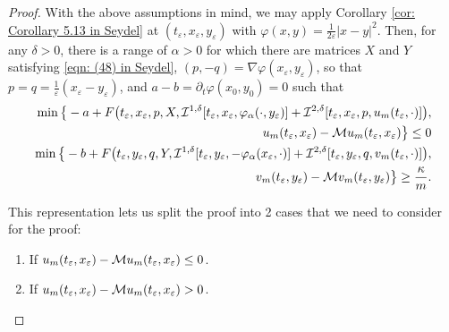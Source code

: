 \begin{proof}
    With the above assumptions in mind, we may apply Corollary \ref{cor: Corollary 5.13 in Seydel} at $(t_\varepsilon,x_\varepsilon,y_\varepsilon)$ with $\varphi(x,y) = \frac{1}{2\varepsilon} |x-y|^2$. Then, for any $\delta > 0$, there is a range of $\alpha>0$ for which there are matrices $X$ and $Y$ satisfying \eqref{eqn: (48) in Seydel}, $(p,-q) = \nabla \varphi(x_\varepsilon,y_\varepsilon)$, so that $p=q=\frac{1}{\varepsilon}(x_\varepsilon - y_\varepsilon)$, and $a-b= \partial_t \varphi(x_0,y_0) = 0$ such that
    \begin{equation*}
        \begin{aligned}
            \min \big\{-a + F\big(t_\varepsilon, x_\varepsilon, p, X, \mathcal{I}^{1,\delta}[t_\varepsilon,x_\varepsilon,\varphi_\alpha(\cdot,y_\varepsilon)] + \mathcal{I}^{2,\delta}[t_\varepsilon,x_\varepsilon,p,u_m(t_\varepsilon,\cdot)]\big), \\
            u_m(t_\varepsilon, x_\varepsilon) - \mathcal{M} u_m(t_\varepsilon,x_\varepsilon) \big\} \leq 0 \\
            \min \big\{-b + F\big(t_\varepsilon, y_\varepsilon, q, Y, \mathcal{I}^{1,\delta}[t_\varepsilon,y_\varepsilon,-\varphi_\alpha(x_\varepsilon, \cdot)] + \mathcal{I}^{2,\delta}[t_\varepsilon,y_\varepsilon,q,v_m(t_\varepsilon,\cdot)]\big), \\
            v_m(t_\varepsilon, y_\varepsilon) - \mathcal{M} v_m(t_\varepsilon,y_\varepsilon) \big\} \geq \frac{\kappa}{m}.
        \end{aligned}
    \end{equation*}
    
    This representation lets us split the proof into 2 cases that we need to consider for the proof: 
    \begin{enumerate}[label=\textbf{Case 2\alph*:}, leftmargin=*, labelsep=.6em]
        \item If $u_m(t_\varepsilon,x_\varepsilon) - \mathcal{M} u_m(t_\varepsilon,x_\varepsilon) \leq 0$.
        \item If $u_m(t_\varepsilon,x_\varepsilon) - \mathcal{M} u_m(t_\varepsilon,x_\varepsilon) > 0$.
    \end{enumerate}


\end{proof}
